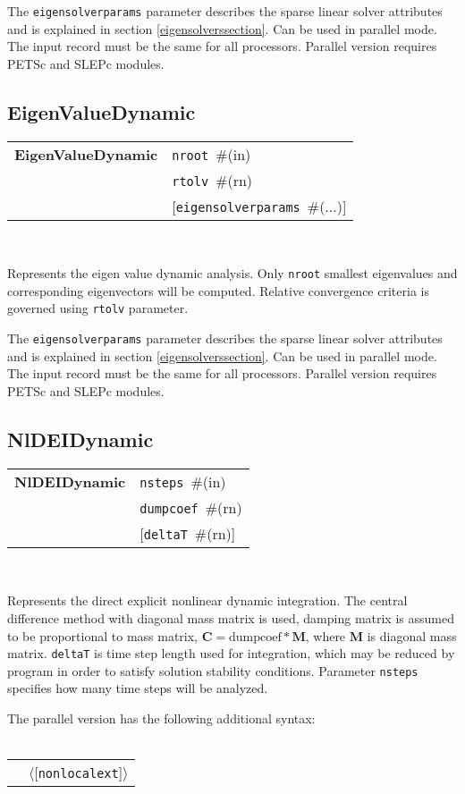 \documentclass[a4paper]{report}
\newcommand{\mbf}[1]{\boldsymbol{#1}}
\newcommand{\param}[1]{\texttt{#1}} %
\newcommand{\optional}[1]{[#1]} %
\newcommand{\field}[2]{\param{#1}~\#{\tiny(#2)}} %
\newcommand{\optField}[2]{\optional{\field{#1}{#2}}}
\newcommand{\optFieldnotype}[1]{[\param{#1}]}
\newcommand{\entKeywordInst}[1]{\textbf{#1}} %
\newcommand{\Pmode}[1]{{\sffamily #1}}
\newcommand{\oofemParallel}[1]{$\langle${#1}$\rangle$}
\newcommand{\PoptFieldnotype}[1]{\oofemParallel{\optFieldnotype{#1}}}
\newenvironment{record}[1][]{\begin{tabular}{|ll}}{\end{tabular}\\}
\newcommand{\recentry}[2]{{#1}&{#2}\\}
\newcounter{rcc}
\newenvironment{record}[1][\textwidth]{\setcounter{rcc}{0}\rowcolors{1}{lightgray}{lightgray}\tabularx{#1}{llR} \hline}
               {\endtabularx}
\newcommand{\recentry}[2]{\ifthenelse{\value{rcc}>0}{$\backslash$ \\}{\setcounter{rcc}{1}}{#1}&{#2}&}
\begin{document}
The \param{eigensolverparams} parameter describes the sparse
linear solver attributes and is explained in section \ref{eigensolverssection}.
\Pmode{Can be used in parallel mode. The input record must be the same
for all processors. Parallel version requires PETSc and SLEPc modules.}

\subsection{EigenValueDynamic}
\label{EigenValueDynamic}
\begin{record}
  \recentry{\entKeywordInst{EigenValueDynamic}}{\field{nroot}{in}}
  \recentry{}{\field{rtolv}{rn}}
  \recentry{}{\optField{eigensolverparams}{...}}
\end{record}

Represents the eigen value dynamic analysis.
Only \param{nroot} smallest eigenvalues and corresponding
eigenvectors will be computed. Relative convergence criteria is
governed using \param{rtolv} parameter.

The \param{eigensolverparams} parameter describes the sparse
linear solver attributes and is explained in section \ref{eigensolverssection}.
\Pmode{Can be used in parallel mode. The input record must be the same
for all processors. Parallel version requires PETSc and SLEPc modules.}


\subsection{NlDEIDynamic}
\label{NlDEIDynamic}
\begin{record}
  \recentry{\entKeywordInst{NlDEIDynamic}}{\field{nsteps}{in}}
  \recentry{}{\field{dumpcoef}{rn}}
  \recentry{}{\optField{deltaT}{rn}}
\end{record}

Represents the direct explicit  nonlinear dynamic  integration.
The central difference method with diagonal mass matrix is used,
damping matrix is assumed to be proportional to mass matrix, $\mbf{C}
= \mathrm{dumpcoef} * \mbf{M}$, where
$\mbf{M}$ is diagonal mass matrix. \param{deltaT} is time step length used for
integration, which may be reduced by program in order to satisfy
solution stability conditions. Parameter \param{nsteps} specifies
how many time steps will be analyzed.

The parallel version has the following additional syntax:\\ \\
\begin{record}
  \recentry{}{\PoptFieldnotype{nonlocalext}}
\end{record}
\end{document}
